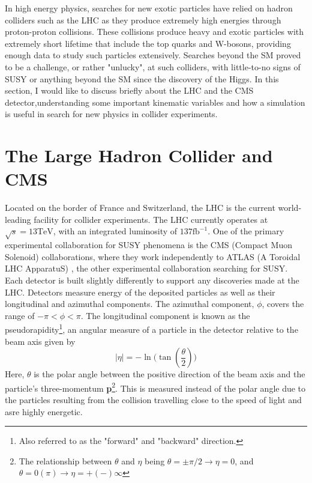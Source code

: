 In high energy physics, searches for new exotic particles have relied on hadron colliders such as the LHC as they produce extremely high energies through proton-proton collisions. These collisions produce heavy and exotic particles with extremely short lifetime that include the top quarks and W-bosons, providing enough data to study such particles extensively. Searches beyond the SM proved to be a  challenge, or rather "unlucky", at such colliders, with little-to-no signs of SUSY or anything beyond the SM since the discovery of the Higgs. In this section, I would like to discuss briefly about the LHC and the CMS detector,understanding some important kinematic variables and how a simulation is useful in search for new physics in collider experiments.

\section{The Large Hadron Collider and CMS}
Located on the border of France and Switzerland, the LHC is the current world-leading facility for collider experiments. The LHC currently operates at $ \sqrt{s}=13 \text{TeV} $, with an integrated luminosity of $137\text{fb}^{-1}$. One of the primary experimental collaboration for SUSY phenomena is the CMS (Compact Muon Solenoid) \cite{chatrchyan2008cms} collaborations, where they work independently to ATLAS (A Toroidal LHC ApparatuS) \cite{collaboration2008atlas}, the other experimental collaboration searching for SUSY.  Each detector is built slightly differently to support any discoveries made at the LHC. Detectors measure energy of the deposited particles as well as their longitudinal and azimuthal components. The azimuthal component, $\phi$, covers the range of $-\pi < \phi < \pi$. The longitudinal component is known as the pseudorapidity\footnote{Also referred to as the "forward" and "backward" direction.}, an angular measure of a particle in the detector relative to the beam axis given by
\begin{equation}
    |\eta|=-\ln\Big(\tan(\frac{\theta}{2})\Big)
    \label{eq:eta}
\end{equation}
Here, $\theta$ is the polar angle between the positive direction of the beam axis and the particle's three-momentum \textbf{p}\footnote{The relationship between $\theta$ and $\eta$ being $\theta = \pm \pi/2 \rightarrow \eta = 0$, and $\theta = 0(\pi) \rightarrow \eta = +(-) \infty$}. This is measured instead of the polar angle due to the particles resulting from the collision travelling close to the speed of light and asre highly energetic. \\

